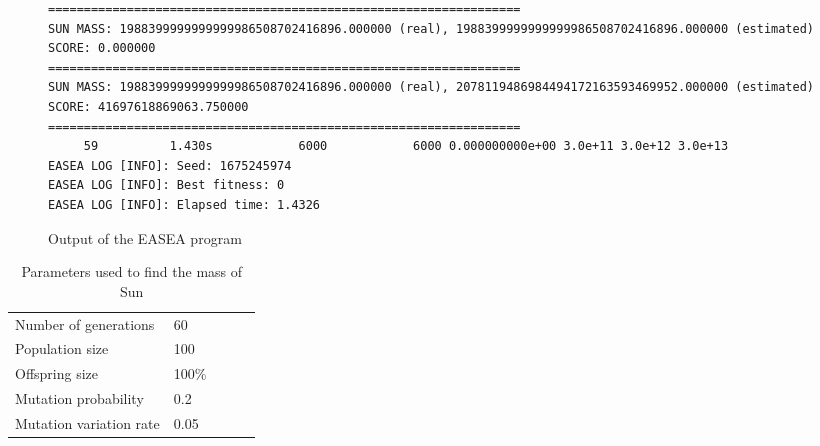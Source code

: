 \begin{figure}[H]
\begin{lstlisting}
==================================================================
SUN MASS: 1988399999999999986508702416896.000000 (real), 1988399999999999986508702416896.000000 (estimated)
SCORE: 0.000000
==================================================================
SUN MASS: 1988399999999999986508702416896.000000 (real), 2078119486984494172163593469952.000000 (estimated)
SCORE: 41697618869063.750000
==================================================================
     59          1.430s            6000            6000 0.000000000e+00 3.0e+11 3.0e+12 3.0e+13
EASEA LOG [INFO]: Seed: 1675245974
EASEA LOG [INFO]: Best fitness: 0
EASEA LOG [INFO]: Elapsed time: 1.4326
\end{lstlisting}
\caption{Output of the EASEA program}
\label{sun_mass_1}
\end{figure}

\begin{table}[H]
    \begin{tabular}{lllll}
    Number of generations & 60 \\
    Population size & 100 \\
    Offspring size & 100\% \\
    Mutation probability & 0.2 \\
    Mutation variation rate & 0.05
    \end{tabular}
    \caption{Parameters used to find the mass of Sun}
    \label{sun_mass_table}
\end{table}

